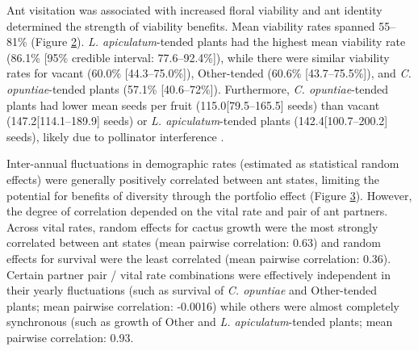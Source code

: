 \documentclass[11pt]{article}
\begin{document}
\begin{figure}[H]
\caption{}
\label{fig:Surv}
\end{figure} 

Ant visitation was associated with increased floral viability and ant identity determined the strength of viability benefits.
Mean viability rates spanned 55--81\% (Figure \ref{fig:Viab}).
\textit{L. apiculatum}-tended plants had the highest mean viability rate (86.1\% [95\% credible interval: 77.6--92.4\%]), while there were similar viability rates for vacant (60.0\% [44.3--75.0\%]), Other-tended (60.6\% [43.7--75.5\%]), and \textit{C. opuntiae}-tended plants (57.1\% [40.6--72\%]). 
Furthermore, \textit{C. opuntiae}-tended plants had lower mean seeds per fruit (115.0[79.5--165.5] seeds) than vacant (147.2[114.1--189.9] seeds) or \textit{L. apiculatum}-tended plants (142.4[100.7--200.2] seeds), likely due to pollinator interference \citep{Ohm2014}. 


\begin{figure}[H]
	\caption{}
	\label{fig:Viab}
\end{figure}


Inter-annual fluctuations in demographic rates (estimated as statistical random effects) were generally positively correlated between ant states, limiting the potential for benefits of diversity through the portfolio effect (Figure \ref{fig:Annual_Ant}).
However, the degree of correlation depended on the vital rate and pair of ant partners. 
Across vital rates, random effects for cactus growth were the most strongly correlated between ant states (mean pairwise correlation: 0.63) and random effects for survival were the least correlated (mean pairwise correlation: 0.36).  
Certain partner pair / vital rate combinations were effectively independent in their yearly fluctuations (such as survival of \textit{C. opuntiae} and Other-tended plants; mean pairwise correlation: -0.0016) while others were almost completely synchronous (such as growth of Other and \textit{L. apiculatum}-tended plants; mean pairwise correlation: 0.93.

\begin{figure}[H]
	\caption{}
	\label{fig:Annual_Ant}
\end{figure} 
\end{document}
